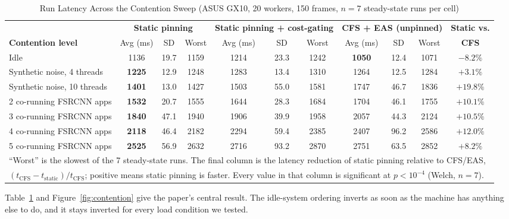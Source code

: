 \documentclass[conference]{IEEEtran}
\begin{document}
\begin{table}[t]
\caption{Run Latency Across the Contention Sweep (ASUS GX10, 20 workers, 150 frames, $n=7$ steady-state runs per cell)}
\begin{center}
\small
\begin{adjustbox}{max width=\textwidth}
\begin{tabular}{|l|ccc|ccc|ccc|c|}
\hline
& \multicolumn{3}{c|}{\textbf{Static pinning}} & \multicolumn{3}{c|}{\textbf{Static pinning + cost-gating}} & \multicolumn{3}{c|}{\textbf{CFS + EAS (unpinned)}} & \textbf{Static vs.} \\
\textbf{Contention level} & Avg (ms) & SD & Worst & Avg (ms) & SD & Worst & Avg (ms) & SD & Worst & \textbf{CFS} \\
\hline
Idle & 1136 & 19.7 & 1159 & 1214 & 23.3 & 1242 & \textbf{1050} & 12.4 & 1071 & $-8.2\%$ \\
\hline
Synthetic noise, 4 threads & \textbf{1225} & 12.9 & 1248 & 1283 & 13.4 & 1310 & 1264 & 12.5 & 1284 & $+3.1\%$ \\
Synthetic noise, 10 threads & \textbf{1401} & 13.0 & 1427 & 1503 & 55.0 & 1581 & 1747 & 46.7 & 1836 & $+19.8\%$ \\
\hline
2 co-running FSRCNN apps & \textbf{1532} & 20.7 & 1555 & 1644 & 28.3 & 1684 & 1704 & 46.1 & 1755 & $+10.1\%$ \\
3 co-running FSRCNN apps & \textbf{1840} & 47.1 & 1940 & 1906 & 39.9 & 1958 & 2057 & 44.3 & 2124 & $+10.5\%$ \\
4 co-running FSRCNN apps & \textbf{2118} & 46.4 & 2182 & 2294 & 59.4 & 2385 & 2407 & 96.2 & 2586 & $+12.0\%$ \\
5 co-running FSRCNN apps & \textbf{2525} & 56.9 & 2632 & 2716 & 93.2 & 2870 & 2751 & 63.5 & 2852 & $+8.2\%$ \\
\hline
\multicolumn{11}{l}{\footnotesize ``Worst'' is the slowest of the 7 steady-state runs. The final column is the latency reduction of static pinning relative to CFS/EAS,}\\
\multicolumn{11}{l}{\footnotesize $(t_\mathrm{CFS}-t_\mathrm{static})/t_\mathrm{CFS}$; positive means static pinning is faster. Every value in that column is significant at $p<10^{-4}$ (Welch, $n=7$).}\\
\end{tabular}
\end{adjustbox}
\label{tab:contention}
\end{center}
\end{table}

Table~\ref{tab:contention} and Figure~\ref{fig:contention} give the paper's central result. The idle-system ordering inverts as soon as the machine has anything else to do, and it stays inverted for every load condition we tested.
\end{document}
